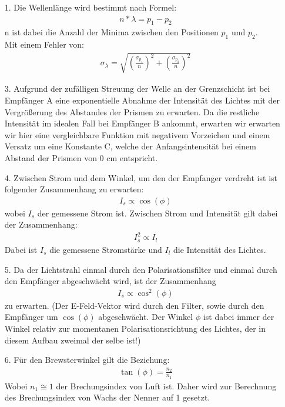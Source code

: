 \documentclass[12pt]{scrartcl}
\begin{document}
\begin{enumerate}
\item[1.]
Die Wellenlänge wird bestimmt nach Formel:
\begin{align}
n*\lambda = p_1 - p_2
\end{align}
n ist dabei die Anzahl der Minima zwischen den Positionen $p_1$ und $p_2$.\\
Mit einem Fehler von:
\begin{align}
\sigma_{\lambda} = \sqrt{
\left(\frac{\sigma_{p_1}}{n}\right)^2+
\left(\frac{\sigma_{p_2}}{n}\right)^2}
\end{align}
\item[3.]
Aufgrund der zufälligen Streuung der Welle an der Grenzschicht ist bei Empfänger A eine exponentielle Abnahme der Intensität des Lichtes mit der Vergrößerung des Abstandes der Prismen zu erwarten. Da die restliche Intensität im idealen Fall bei Empfänger B ankommt, erwarten wir erwarten wir hier eine vergleichbare Funktion mit negativem Vorzeichen und einem Versatz um eine Konstante C, welche der Anfangsintensität bei einem Abstand der Prismen von 0 cm entspricht.
\item[4.]
Zwischen Strom und dem Winkel, um den der Empfanger verdreht ist ist folgender Zusammenhang zu erwarten:
\begin{align}
I_s \propto \cos(\phi)
\end{align}
wobei $I_s$ der gemessene Strom ist.
Zwischen Strom und Intensität gilt dabei der Zusammenhang:
\begin{align}
I_s^2 \propto I_l
\end{align}
Dabei ist $I_s$ die gemessene Stromstärke und $I_l$ die Intensität des Lichtes.
\item[5.]
Da der Lichtstrahl einmal durch den Polarisationsfilter und einmal durch den Empfänger abgeschwächt wird, ist der Zusammenhang
\begin{align}
I_s \propto \cos^2(\phi)
\end{align}
zu erwarten. (Der E-Feld-Vektor wird durch den Filter, sowie durch den Empfänger um $\cos(\phi)$ abgeschwächt. Der Winkel $\phi$ ist dabei immer der Winkel relativ zur momentanen Polarisationsrichtung des Lichtes, der in diesem Aufbau zweimal der selbe ist!)
\item[6.]
Für den Brewsterwinkel gilt die Beziehung:
\begin{align}
\tan(\phi) = \frac{n_2}{n_1}
\end{align}
Wobei $n_1 \cong 1$ der Brechungsindex von Luft ist. Daher wird zur Berechnung des Brechungsindex von Wachs der Nenner auf 1 gesetzt.
\end{enumerate}
\end{document}
